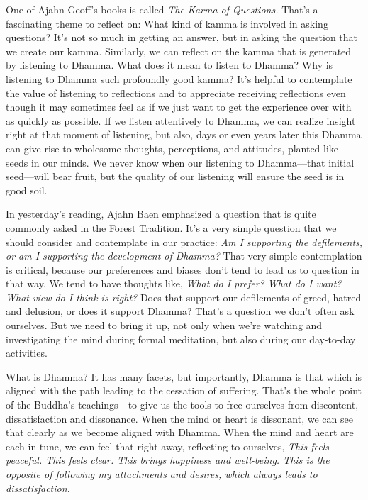 One of Ajahn Geoff's books is called \emph{The Karma of Questions.} 
That's a fascinating theme to reflect on: What kind of kamma is 
involved in asking questions? It's not so much in getting an answer, 
but in asking the question that we create our kamma. Similarly, we can 
reflect on the kamma that is generated by listening to Dhamma. What 
does it mean to listen to Dhamma? Why is listening to Dhamma such 
profoundly good kamma? It's helpful to contemplate the value of 
listening to reflections and to appreciate receiving reflections even 
though it may sometimes feel as if we just want to get the experience 
over with as quickly as possible. If we listen attentively to Dhamma, 
we can realize insight right at that moment of listening, but also, 
days or even years later this Dhamma can give rise to wholesome 
thoughts, perceptions, and attitudes, planted like seeds in our minds. 
We never know when our listening to Dhamma---that initial seed---will 
bear fruit, but the quality of our listening will ensure the seed is in 
good soil.


In yesterday's reading, Ajahn Baen emphasized a question that is quite 
commonly asked in the Forest Tradition. It's a very simple question 
that we should consider and contemplate in our practice: \emph{Am I 
supporting the defilements, or am I supporting the development of 
Dhamma?} That very simple contemplation is critical, because our 
preferences and biases don't tend to lead us to question in that way. 
We tend to have thoughts like, \emph{What do I prefer? What do I want? 
What view do I think is right?} Does that support our defilements of 
greed, hatred and delusion, or does it support Dhamma? That's a 
question we don't often ask ourselves. But we need to bring it up, not 
only when we're watching and investigating the mind during formal 
meditation, but also during our day-to-day activities.

What is Dhamma? It has many facets, but importantly, Dhamma is that 
which is aligned with the path leading to the cessation of suffering. 
That's the whole point of the Buddha's teachings---to give us the tools 
to free ourselves from discontent, dissatisfaction and dissonance. When 
the mind or heart is dissonant, we can see that clearly as we become 
aligned with Dhamma. When the mind and heart are each in tune, we can 
feel that right away, reflecting to ourselves, \emph{This feels 
peaceful. This feels clear. This brings happiness and well-being. This 
is the opposite of following my attachments and desires, which always 
leads to dissatisfaction.}

